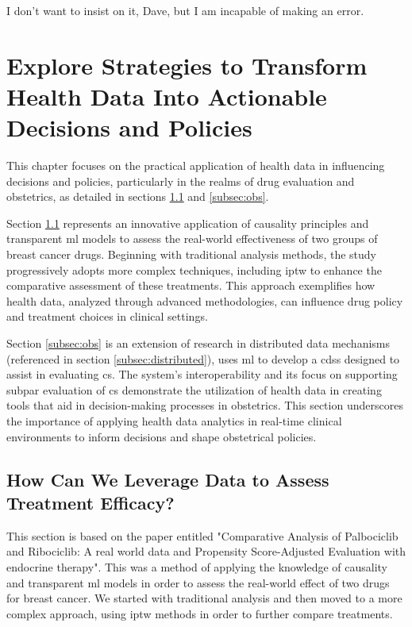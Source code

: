 
\begin{savequote}[85mm]
    I don’t want to insist on it, Dave, but I am incapable of making an error.
    \end{savequote}
    
\chapter{Explore Strategies to Transform Health Data Into Actionable Decisions and Policies}\label{chap:goal3}
This chapter focuses on the practical application of health data in influencing decisions and policies, particularly in the realms of drug evaluation and obstetrics, as detailed in sections \ref{subsec:ipop} and \ref{subsec:obs}.

Section \ref{subsec:ipop} represents an innovative application of causality principles and transparent \ac{ml} models to assess the real-world effectiveness of two groups of breast cancer drugs. Beginning with traditional analysis methods, the study progressively adopts more complex techniques, including \ac{iptw} to enhance the comparative assessment of these treatments. This approach exemplifies how health data, analyzed through advanced methodologies, can influence drug policy and treatment choices in clinical settings.

Section \ref{subsec:obs} is an extension of research in distributed data mechanisms (referenced in section \ref{subsec:distributed}), uses \ac{ml} to develop a \ac{cdss} designed to assist in evaluating \ac{cs}. The system's interoperability and its focus on supporting subpar evaluation of \ac{cs} demonstrate the utilization of health data in creating tools that aid in decision-making processes in obstetrics. This section underscores the importance of applying health data analytics in real-time clinical environments to inform decisions and shape obstetrical policies.



\section{How Can We Leverage Data to Assess Treatment Efficacy?}\label{subsec:ipop}
This section is based on the paper entitled "Comparative Analysis of Palbociclib and Ribociclib: A real world data and Propensity Score-Adjusted Evaluation with endocrine therapy". This was a method of applying the knowledge of causality and transparent \ac{ml} models in order to assess the real-world effect of two drugs for breast cancer. We started with traditional analysis and then moved to a more complex approach, using \ac{iptw} methods in order to further compare treatments.
    

